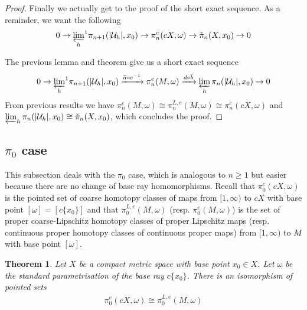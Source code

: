 \documentclass[a4paper,11pt]{article}
\theoremstyle{definition}
\theoremstyle{plain}
\newtheorem{theorem}[definition]{Theorem}
\theoremstyle{remark}
\begin{document}
{\begin{proof} Finally we actually get to the proof of the short exact sequence. As a reminder, we want the following
\begin{align*}
0\rightarrow {\varprojlim_h}^1  \pi_{n+1}(|\mathcal{U}_{h}|,x_0) \rightarrow \pi_{n}^{c}(cX,\omega) \rightarrow  \check{\pi}_n(X,x_0) \rightarrow 0
\end{align*}

The previous lemma and theorem give us a short exact sequence
\begin{align*}
0\rightarrow {\varprojlim_h}^1  \pi_{n+1}(|\mathcal{U}_{h}|,x_0) \xrightarrow{\overline{a} \circ c^{-1}}\pi_{n}^{e}(M,\omega) \xrightarrow{d\circ \overline{b}}\varprojlim_{h} \pi_{n}(|\mathcal{U}_{h}|,x_0) \rightarrow 0
\end{align*}
From previous results we have $\pi^{e}_{n}(M,\omega) \cong \pi^{L,e}_{n}(M,\omega) \cong \pi_{n}^{c}(cX,\omega)$ and $\varprojlim_{h} \pi_{n}(|\mathcal{U}_{h}|,x_0) \cong \check{\pi}_n(X,x_0)$, which concludes the proof. 
\end{proof}

\subsection{$\pi_0$ case}

This subsection deals with the $\pi_0$ case, which is analogous to $n\geq 1$ but easier because there are no change of base ray homomorphisms. Recall that $\pi_0^{c}(cX,\omega)$ is the pointed set of coarse homotopy classes of maps from $[1,\infty)$ to $cX$ with base point $[\omega] = [c\{x_0\}]$ and that $\pi_0^{L,e}(M,\omega)$ (resp. $\pi_{0}^{e}(M,\omega)$) is the set of proper coarse-Lipschitz homotopy classes of proper Lipschitz maps (resp. continuous proper homotopy classes of continuous proper maps) from $[1,\infty)$ to $M$ with base point $[\omega]$. 


\begin{theorem} Let $X$ be a compact metric space with base point $x_0\in X$. Let $\omega$ be the standard parametrisation of the base ray $c\{x_0\}$. There is an isomorphism of pointed sets
\begin{align*}
 \pi_{0}^c(cX,\omega) \cong \pi^{L,e}_{0}(M,\omega) 
\end{align*}
\end{theorem}

}
\end{document}

